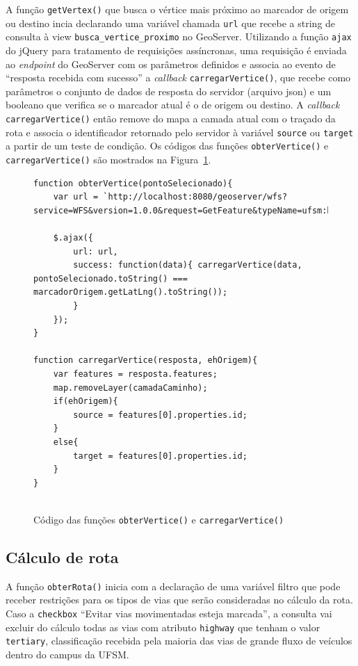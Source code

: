 \documentclass[oneside,openright,12pt]{ufsm_2015} %
\begin{document}
A função {\tt getVertex()} que busca o vértice mais próximo ao marcador de origem ou destino incia declarando uma variável chamada {\tt url} que recebe a string de consulta à view {\tt busca\_vertice\_proximo} no GeoServer. Utilizando a função {\tt ajax} do jQuery para tratamento de requisições assíncronas, uma requisição é enviada ao \textit{endpoint} do GeoServer com os parâmetros definidos e associa ao evento de ``resposta recebida com sucesso'' a \textit{callback} {\tt carregarVertice()}, que recebe como parâmetros o conjunto de dados de resposta do servidor (arquivo json) e um booleano que verifica se o marcador atual é o de origem ou destino. 
A \textit{callback} {\tt carregarVertice()} então remove do mapa a camada atual com o traçado da rota e associa o identificador retornado pelo servidor à variável {\tt source} ou {\tt target} a partir de um teste de condição. 
Os códigos das funções {\tt obterVertice()} e {\tt carregarVertice()} são mostrados na Figura~\ref{codigo:obterVertice}.


\begin{figure}
    \centering
    \caption{Código das funções {\tt obterVertice()} e {\tt carregarVertice()}}
    \label{codigo:obterVertice}
    \begin{lstlisting}[]
function obterVertice(pontoSelecionado){
    var url = `http://localhost:8080/geoserver/wfs?service=WFS&version=1.0.0&request=GetFeature&typeName=ufsm:busca_vertice_proximo&outputformat=application/json&viewparams=x:${selectedPoint.lng};y:${selectedPoint.lat};';

    $.ajax({
        url: url,
        success: function(data){ carregarVertice(data, pontoSelecionado.toString() === marcadorOrigem.getLatLng().toString());
        }
    });
}

function carregarVertice(resposta, ehOrigem){
    var features = resposta.features;
    map.removeLayer(camadaCaminho);
    if(ehOrigem){
        source = features[0].properties.id;
    }
    else{
        target = features[0].properties.id;
    }
}
  
\end{lstlisting}
\end{figure}




\subsection{Cálculo de rota}
A função {\tt obterRota()} inicia com a declaração de uma variável filtro que pode receber restrições para os tipos de vias que serão consideradas no cálculo da rota.
Caso a {\tt checkbox} ``Evitar vias movimentadas esteja marcada'', a consulta vai excluir do cálculo todas as vias com atributo {\tt highway} que tenham o valor {\tt tertiary}, classificação recebida pela maioria das vias de grande fluxo de veículos dentro do campus da UFSM.
\end{document}

